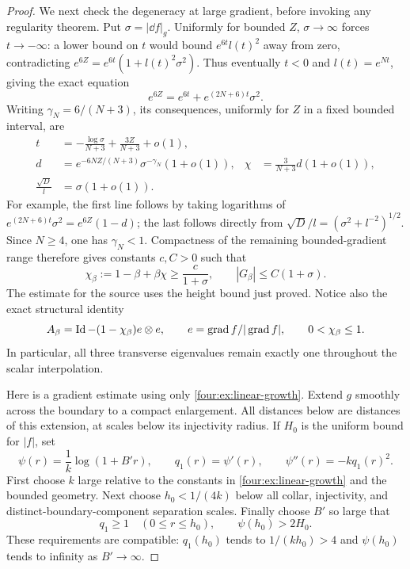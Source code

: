 \begin{proof}
We next check the degeneracy at large gradient, before invoking any
regularity theorem.  Put $\sigma=|\dd f|_g$.  Uniformly for bounded $Z$,
$\sigma\to\infty$ forces $t\to-\infty$: a lower bound on $t$ would bound
$e^{6t}l(t)^2$ away from zero, contradicting
$e^{6Z}=e^{6t}(1+l(t)^2\sigma^2)$.  Thus eventually $t<0$ and
$l(t)=e^{Nt}$, giving the exact equation
\begin{equation}\label{four:ex:large-gradient-equation}
 e^{6Z}=e^{6t}+e^{(2N+6)t}\sigma^2.
\end{equation}
Writing $\gamma_N=6/(N+3)$, its consequences, uniformly for $Z$ in a
fixed bounded interval, are
\begin{align}
 t&=-\frac{\log\sigma}{N+3}+\frac{3Z}{N+3}+o(1),\nonumber\\
 d&=e^{-6NZ/(N+3)}\sigma^{-\gamma_N}(1+o(1)),
 &\chi&=\frac{3}{N+3}d(1+o(1)),\label{four:ex:large-gradient}\\
 \frac{\sqrt D}{l}&=\sigma(1+o(1)).\nonumber
\end{align}
For example, the first line follows by taking logarithms of
$e^{(2N+6)t}\sigma^2=e^{6Z}(1-d)$; the last follows directly from
$\sqrt D/l=(\sigma^2+l^{-2})^{1/2}$.
Since $N\ge4$, one has $\gamma_N<1$.  Compactness of the remaining
bounded-gradient range therefore gives constants $c,C>0$ such that
\begin{equation}\label{four:ex:linear-growth}
 \chi_\beta:=1-\beta+\beta\chi\ge\frac{c}{1+\sigma},
 \qquad |G_\beta|\le C(1+\sigma).
\end{equation}
The estimate for the source uses the height bound just proved.  Notice
also the exact structural identity
\[
 A_\beta=\operatorname{Id}-(1-\chi_\beta)e\otimes e,
 \qquad e=\operatorname{grad} f/|\operatorname{grad} f|,
 \qquad 0<\chi_\beta\le1.
\]
In particular, all three transverse eigenvalues remain exactly one
throughout the scalar interpolation.

Here is a gradient estimate using only \eqref{four:ex:linear-growth}.
Extend $g$ smoothly across the boundary to a compact enlargement.  All
distances below are distances of this extension, at scales below its
injectivity radius.  If $H_0$ is the uniform bound for $|f|$, set
\[
 \psi(r)=\frac1k\log(1+B'r),\qquad
 q_1(r)=\psi'(r),\qquad \psi''(r)=-kq_1(r)^2.
\]
First choose $k$ large relative to the constants in
\eqref{four:ex:linear-growth} and the bounded geometry.  Next choose
$h_0<1/(4k)$ below all collar, injectivity, and distinct-boundary-component
separation scales.  Finally choose $B'$ so large that
\begin{equation}\label{four:ex:log-choices}
 q_1\ge1\quad(0\le r\le h_0),\qquad
 \psi(h_0)>2H_0.
\end{equation}
These requirements are compatible: $q_1(h_0)$ tends to $1/(kh_0)>4$
and $\psi(h_0)$ tends to infinity as $B'\to\infty$.


\end{proof}
